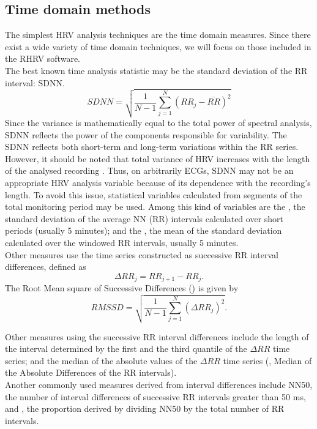 \documentclass[12pt,lot, lof]{puthesis}
\begin{document}
\subsection{Time domain methods\label{sec:timedomain}}
The simplest \gls{HRV} analysis techniques are the time domain measures. Since 
there exist a wide variety of time domain techniques, we will focus on those 
included in the RHRV software. \\
The best known time analysis statistic may be the standard deviation of the RR 
interval: \gls{SDNN}.
$$SDNN=\sqrt{\frac{1}{N-1}\sum_{j=1}^{N}(RR_j-\overline{RR})^2}$$
Since the variance is mathematically equal to the total power of spectral 
analysis, \gls{SDNN} reflects the 
power of the components responsible for variability. The  \gls{SDNN} reflects 
both short-term and long-term variations within the RR  series. However, it 
should be noted that total variance of \gls{HRV}
increases with the length of the analysed recording \cite{saul1988analysis}. 
Thus, on arbitrarily ECGs,  \gls{SDNN}
may not be an appropriate \gls{HRV} analysis variable because of its dependence 
with the recording's length. To avoid this issue, statistical variables 
calculated from segments of the total monitoring period may be used. Among this 
kind of variables are the , the standard deviation of  
the average NN (RR) intervals calculated over short periods (usually 5 
minutes); and the , the mean
of the standard deviation calculated over the windowed RR intervals, usually 5 
minutes.\\

Other measures use the time series constructed as successive RR interval 
differences, defined as  $$\Delta RR_j=RR_{j+1}-RR_j.$$  The Root Mean square 
of Successive Differences () is given by
$$RMSSD=\sqrt{\frac{1}{N-1}\sum_{j=1}^{N}(\Delta RR_j)^2}.$$

Other measures using the successive RR interval differences include the length 
of the interval determined by the first and the third quantile of the $\Delta 
RR$ time series; and the median of the absolute values of the  $\Delta RR$ time 
series (, Median of the Absolute Differences of the RR 
intervals).\\

Another commonly used measures derived from interval differences include NN50, 
the number of interval differences of successive RR intervals greater than 50 
ms, and , the proportion derived
by dividing NN50 by the total number of RR intervals.\\
\end{document}
